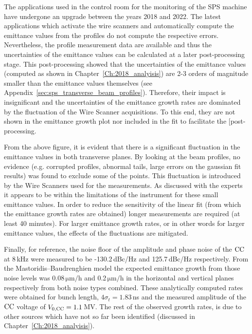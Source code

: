 The applications used in the control room for the monitoring of the SPS machine have undergone an upgrade between the years 2018 and 2022. The latest applications which activate the wire scanners and automatically compute the emittance values from the profiles do not compute the respective errors. Nevertheless, the profile measurement data are available and thus the uncertainties of the emittance values can be calculated at a later post-processing stage. This post-processing showed that the uncertainties of the emittance values (computed as shown in Chapter~\ref{Ch:2018_analyisis}) are 2-3 orders of magnitude smaller than the emittance values themselves (see Appendix~\ref{sec:sps_transverse_beam_profiles}). Therefore, their impact is insignificant and the uncertainties of the emittance growth rates are dominated by the fluctuation of the Wire Scanner acquisitions. To this end, they are not shown in the emittance growth plot nor included in the fit to facilitate the [post-processing.

From the above figure, it is evident that there is a significant fluctuation in the emittance values in both transverse planes. By looking at the beam profiles, no evidence (e.g. corrupted profiles, abnormal tails, large errors on the gaussian fit results) was found to exclude some of the points. This fluctuation is introduced by the Wire Scanners used for the measurements. As discussed with the experts it appears to be within the limitations of the instrument for these small emittance values. In order to reduce the sensitivity of the linear fit (from which the emittance growth rates are obtained) longer measurements are required (at least 40 minutes). For larger emittance growth rates, or in other words for larger emittance values, the effects of the fluctuations are mitigated.

Finally, for reference, the noise floor of the amplitude and phase noise of the ${\mathrm{CC}}$ at 8\,kHz were measured to be -130.2\,dBc/Hz and 125.7\,dBc/Hz respectively. From the Mastoridis--Baudrenghien model the expected emittance growth from those noise levels was 0.08\,$\mathrm{\mu m/h}$ and 0.2\,$\mathrm{\mu m/h}$ in the horizontal and vertical planes respectively from both noise types combined. These analytically computed rates were obtained for bunch length, $4\sigma_t=1.83$\,ns and the measured amplitude of the ${\mathrm{CC}}$ voltage of ${V_\mathrm{0, CC}}=1.1$\,MV.
The rest of the observed growth rates, is due to other sources which have not so far been identified (discussed in Chapter~\ref{Ch:2018_analyisis}).




